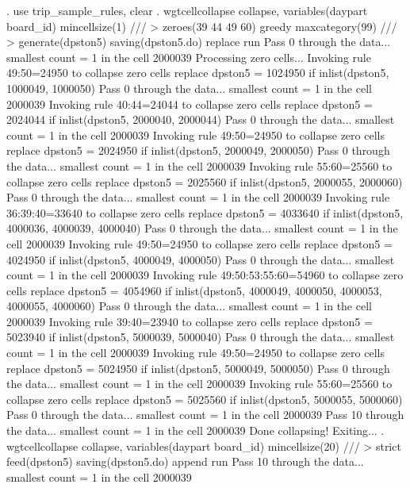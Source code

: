 . use trip_sample_rules, clear
{\smallskip}
. wgtcellcollapse collapse, variables(daypart board_id) mincellsize(1) ///
>         zeroes(39 44 49 60) greedy maxcategory(99) ///
>         generate(dpston5) saving(dpston5.do) replace run
Pass 0 through the data...
  smallest count = 1 in the cell      2000039
{\smallskip}
Processing zero cells...
{\smallskip}
  Invoking rule 49:50=24950 to collapse zero cells
  replace dpston5 = 1024950 if inlist(dpston5, 1000049, 1000050)
Pass 0 through the data...
  smallest count = 1 in the cell      2000039
  Invoking rule 40:44=24044 to collapse zero cells
  replace dpston5 = 2024044 if inlist(dpston5, 2000040, 2000044)
Pass 0 through the data...
  smallest count = 1 in the cell      2000039
  Invoking rule 49:50=24950 to collapse zero cells
  replace dpston5 = 2024950 if inlist(dpston5, 2000049, 2000050)
Pass 0 through the data...
  smallest count = 1 in the cell      2000039
  Invoking rule 55:60=25560 to collapse zero cells
  replace dpston5 = 2025560 if inlist(dpston5, 2000055, 2000060)
Pass 0 through the data...
  smallest count = 1 in the cell      2000039
  Invoking rule 36:39:40=33640 to collapse zero cells
  replace dpston5 = 4033640 if inlist(dpston5, 4000036, 4000039, 4000040)
Pass 0 through the data...
  smallest count = 1 in the cell      2000039
  Invoking rule 49:50=24950 to collapse zero cells
  replace dpston5 = 4024950 if inlist(dpston5, 4000049, 4000050)
Pass 0 through the data...
  smallest count = 1 in the cell      2000039
  Invoking rule 49:50:53:55:60=54960 to collapse zero cells
  replace dpston5 = 4054960 if inlist(dpston5, 4000049, 4000050, 4000053, 4000055, 4000060)
Pass 0 through the data...
  smallest count = 1 in the cell      2000039
  Invoking rule 39:40=23940 to collapse zero cells
  replace dpston5 = 5023940 if inlist(dpston5, 5000039, 5000040)
Pass 0 through the data...
  smallest count = 1 in the cell      2000039
  Invoking rule 49:50=24950 to collapse zero cells
  replace dpston5 = 5024950 if inlist(dpston5, 5000049, 5000050)
Pass 0 through the data...
  smallest count = 1 in the cell      2000039
  Invoking rule 55:60=25560 to collapse zero cells
  replace dpston5 = 5025560 if inlist(dpston5, 5000055, 5000060)
Pass 0 through the data...
  smallest count = 1 in the cell      2000039
Pass 10 through the data...
  smallest count = 1 in the cell      2000039
  Done collapsing! Exiting...
{\smallskip}
. wgtcellcollapse collapse, variables(daypart board_id) mincellsize(20) ///
>         strict feed(dpston5) saving(dpston5.do) append run
Pass 10 through the data...
  smallest count = 1 in the cell      2000039
